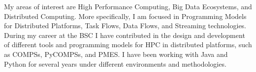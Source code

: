 %
%
%

\par{
My areas of interest are High Performance Computing, Big Data Ecosystems, and Distributed Computing. More specifically, I am focused in Programming Models for Distributed Platforms, Task Flows, Data Flows, and Streaming technologies. During my career at the BSC I have contributed in the design and development of different tools and programming models for HPC in distributed platforms, such as COMPSs, PyCOMPSs, and PMES. I have been working with Java and Python for several years under different environments and methodologies.
}

\vspace{0.5em}
